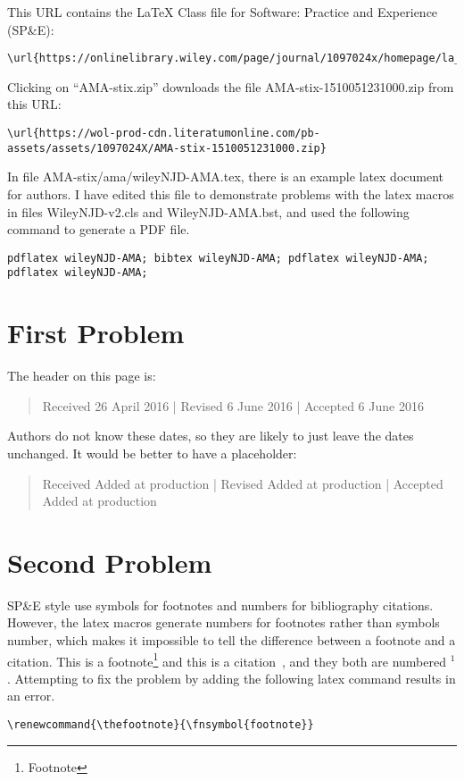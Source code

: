 \documentclass[AMA,STIX1COL]{WileyNJD-v2}
\renewcommand{\thefootnote}{\fnsymbol{footnote}}
\begin{document}
This URL contains the LaTeX Class file for Software: Practice and Experience (SP\&E):
\begin{verbatim}
\url{https://onlinelibrary.wiley.com/page/journal/1097024x/homepage/la_tex_class_file.htm}
\end{verbatim}
Clicking on ``AMA-stix.zip'' downloads the file AMA-stix-1510051231000.zip from this URL:
\begin{verbatim}
\url{https://wol-prod-cdn.literatumonline.com/pb-assets/assets/1097024X/AMA-stix-1510051231000.zip}
\end{verbatim}
In file AMA-stix/ama/wileyNJD-AMA.tex, there is an example latex document for authors.
I have edited this file to demonstrate problems with the latex macros in files WileyNJD-v2.cls and WileyNJD-AMA.bst, and used the following command to generate a PDF file.
\begin{verbatim}
pdflatex wileyNJD-AMA; bibtex wileyNJD-AMA; pdflatex wileyNJD-AMA; pdflatex wileyNJD-AMA;
\end{verbatim}


\section{First Problem}

The header on this page is:
\begin{quote}
Received {\color{red}26 April 2016} | Revised {\color{red}6 June 2016} | Accepted {\color{red}6 June 2016}
\end{quote}
Authors do not know these dates, so they are likely to just leave the dates unchanged.
It would be better to have a placeholder:
\begin{quote}
Received {\color{red}Added at production} | Revised {\color{red}Added at production} | Accepted {\color{red}Added at production}
\end{quote}


\section{Second Problem}

SP\&E style use symbols for footnotes and numbers for bibliography citations.
However, the latex macros generate numbers for footnotes rather than symbols number, which makes it impossible to tell the difference between a footnote and a citation.
This is a footnote\footnote{Footnote} and this is a citation~\cite{book01}, and they both are numbered $^1$.
Attempting to fix the problem by adding the following latex command results in an error.
\begin{verbatim}
\renewcommand{\thefootnote}{\fnsymbol{footnote}}
\end{verbatim}
\end{document}
